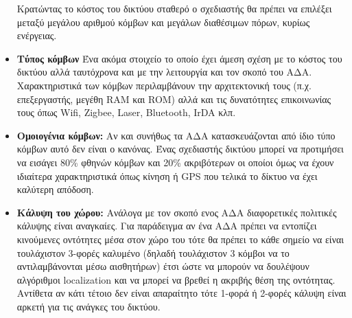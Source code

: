 \begin{itemize}
Κρατώντας το κόστος του δικτύου σταθερό ο σχεδιαστής θα πρέπει να επιλέξει μεταξύ μεγάλου αριθμού κόμβων και μεγάλων διαθέσιμων πόρων, κυρίως ενέργειας.
\item \textbf{Τύπος κόμβων} Ένα ακόμα στοιχείο το οποίο έχει άμεση σχέση με το κόστος του δικτύου αλλά ταυτόχρονα και με την λειτουργία και τον σκοπό του ΑΔΑ.
Χαρακτηριστικά των κόμβων περιλαμβάνουν την αρχιτεκτονική τους (π.χ. επεξεργαστής, μεγέθη RAM και ROM) αλλά και τις δυνατότητες επικοινωνίας τους όπως Wifi,
Zigbee, Laser, Bluetooth, IrDA κλπ.
\item \textbf{Ομοιογένια κόμβων:} Αν και συνήθως τα ΑΔΑ κατασκευάζονται από ίδιο τύπο κόμβων αυτό δεν είναι ο κανόνας.
Ένας σχεδιαστής δικτύου μπορεί να προτιμήσει να εισάγει 80\% φθηνών κόμβων και 20\% ακριβότερων οι οποίοι όμως να έχουν ιδιαίτερα χαρακτηριστικά όπως κίνηση ή GPS που
τελικά το δίκτυο να έχει καλύτερη απόδοση.
\item \textbf{Κάλυψη του χώρου:} Ανάλογα με τον σκοπό ενος ΑΔΑ διαφορετικές πολιτικές κάλυψης είναι αναγκαίες.
Για παράδειγμα αν ένα ΑΔΑ πρέπει να εντοπίζει κινούμενες οντότητες μέσα στον χώρο του τότε θα πρέπει το κάθε σημείο να είναι τουλάχιστον 3-φορές καλυμένο (δηλαδή
τουλάχιστον 3 κόμβοι να το αντιλαμβάνονται μέσω αισθητήρων) έτσι ώστε να μπορούν να δουλέψουν αλγόριθμοι localization και να μπορεί να βρεθεί η ακριβής θέση της
οντότητας.
Αντίθετα αν κάτι τέτοιο δεν είναι απαραίτητο τότε 1-φορά ή 2-φορές κάλυψη είναι αρκετή για τις ανάγκες του δικτύου.
\end{itemize}

